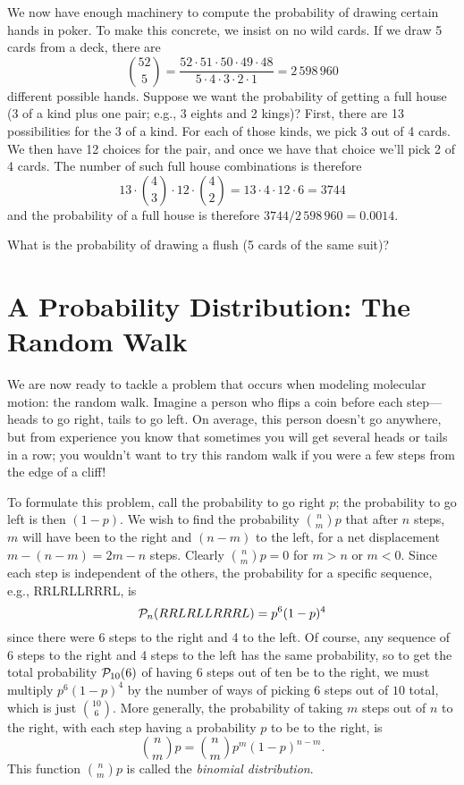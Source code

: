We now have enough machinery to compute the probability of drawing certain hands in poker.  To make this concrete, we insist on no wild cards.  If we draw 5 cards from a deck, there are
\[
{52\choose5} = \frac{52\cdot51\cdot50\cdot49\cdot48}{5\cdot4\cdot3\cdot2\cdot1} = 2\,598\,960 
\]
different possible hands. Suppose we want the probability of getting a full house (3 of a kind plus one pair; e.g., 3 eights and 2 kings)?  First, there are 13 possibilities for the 3 of a kind.  For each of those kinds, we pick 3 out of 4 cards. We then have 12 choices for the pair, and once we have that choice we'll pick 2 of 4 cards.  The number of such full house combinations is therefore
\[
	13\cdot{4\choose3}\cdot12\cdot{4\choose2} = 13\cdot 4\cdot12\cdot 6 = 3744
\]
and the probability of a full house is therefore $3744/2\,598\,960 = 0.0014$.

\begin{exercisebox}
What is the probability of drawing a flush (5 cards of the same suit)?
\end{exercisebox}

\section{A Probability Distribution: The Random Walk}
We are now ready to tackle a problem that occurs when modeling molecular motion: the random walk.  Imagine a person who flips a coin before each step---heads to go right, tails to go left.  On average, this person doesn't go anywhere, but from experience you know that sometimes you will get several heads or tails in a row; you wouldn't want to try this random walk if you were a few steps from the edge of a cliff!

To formulate this problem, call the probability to go right $p$; the probability to go left is then $(1-p)$.  We wish to find the probability $\binom{n}{m}{p}$ that after $n$ steps, $m$ will have been to the right and $(n-m)$ to the left, for a net displacement $m-(n-m) = 2m-n$ steps.
Clearly $\binom{n}{m}{p} = 0$ for $m>n$ or $m<0$.  Since each step is independent of the others, the probability for a specific sequence, e.g., RRLRLLRRRL, is
\begin{equation}\label{e.one-sequence}
	\mathcal{P}_{n}(RRLRLLRRRL) = p^{6}(1-p)^{4}
\end{equation}
since there were 6 steps to the right and 4 to the left.  Of course, any sequence of 6 steps to the right and 4 steps to the left has the same probability, so to get the total probability $\mathcal{P}_{10}(6)$ of having 6 steps out of ten be to the right, we must multiply $p^{6}(1-p)^{4}$ by the number of ways of picking $6$ steps out of $10$ total, which is just $10\choose6$.  More generally, the probability of taking $m$ steps out of $n$ to the right, with each step having a probability $p$ to be to the right, is
\begin{equation}\label{e.binomial}
	\binom{n}{m}{p} = {n\choose m} p^{m}(1-p)^{n-m}.
\end{equation}
This function $\binom{n}{m}{p}$ is called the \emph{binomial distribution}.

